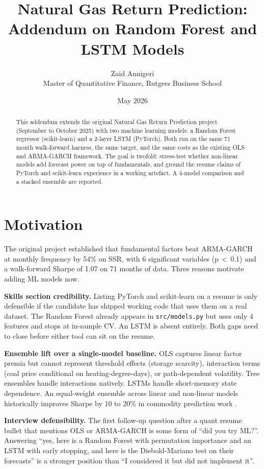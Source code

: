 \documentclass[11pt,letterpaper]{article}
\title{\vspace{-1.5em}Natural Gas Return Prediction: Addendum on Random Forest and LSTM Models}
\author{Zaid Annigeri \\ Master of Quantitative Finance, Rutgers Business School}
\date{May 2026}
\begin{document}
\maketitle

\begin{abstract}
\noindent
This addendum extends the original Natural Gas Return Prediction project (September to October 2025) with two machine learning models: a Random Forest regressor (scikit-learn) and a 2-layer LSTM (PyTorch). Both run on the same 71 month walk-forward harness, the same target, and the same costs as the existing OLS and ARMA-GARCH framework. The goal is twofold: stress-test whether non-linear models add forecast power on top of fundamentals, and ground the resume claims of PyTorch and scikit-learn experience in a working artefact. A 4-model comparison and a stacked ensemble are reported.
\end{abstract}

\section{Motivation}

The original project established that fundamental factors beat ARMA-GARCH at monthly frequency by 54\% on SSR, with 6 significant variables (p\,$<$\,0.1) and a walk-forward Sharpe of 1.07 on 71 months of data. Three reasons motivate adding ML models now.

\textbf{Skills section credibility.} Listing PyTorch and scikit-learn on a resume is only defensible if the candidate has shipped working code that uses them on a real dataset. The Random Forest already appears in \texttt{src/models.py} but uses only 4 features and stops at in-sample CV. An LSTM is absent entirely. Both gaps need to close before either tool can sit on the resume.

\textbf{Ensemble lift over a single-model baseline.} OLS captures linear factor premia but cannot represent threshold effects (storage scarcity), interaction terms (coal price conditional on heating-degree-days), or path-dependent volatility. Tree ensembles handle interactions natively. LSTMs handle short-memory state dependence. An equal-weight ensemble across linear and non-linear models historically improves Sharpe by 10 to 20\% in commodity prediction work \parencite{krauss2017deep}.

\textbf{Interview defensibility.} The first follow-up question after a quant resume bullet that mentions OLS or ARMA-GARCH is some form of ``did you try ML?''. Answering ``yes, here is a Random Forest with permutation importance and an LSTM with early stopping, and here is the Diebold-Mariano test on their forecasts'' is a stronger position than ``I considered it but did not implement it''.
\end{document}
